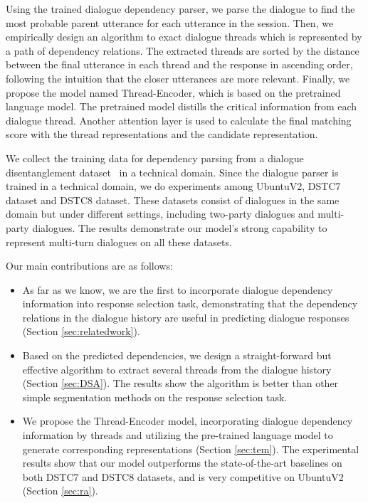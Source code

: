 Using the trained dialogue dependency parser, we parse the dialogue 
to find the most probable parent utterance for each utterance in the session. 
Then, we empirically design an algorithm to exact dialogue threads which is represented by a path of dependency relations.
The extracted threads are sorted by the distance between the final utterance in each 
thread and the response in ascending order, following the intuition that the closer utterances are more relevant.
Finally, we propose the model named Thread-Encoder, which is based on the pretrained language 
model. 
The pretrained model 
distills the critical information from each dialogue thread. 
Another attention layer is used to calculate the final matching score 
with the thread representations and the candidate representation. 

We collect the training data for dependency parsing from a dialogue 
disentanglement dataset~\cite{KummerfeldGPAGG19} in a technical domain. 
Since the dialogue parser is trained in a technical domain,  
we do experiments among UbuntuV2, DSTC7 dataset and DSTC8 dataset. 
These datasets consist of dialogues in the same domain but under different settings, 
including two-party dialogues and multi-party dialogues. 
The results demonstrate our model's strong capability to represent multi-turn
dialogues on all these datasets.

 
Our main contributions are as follows:
\begin{itemize}
	\item As far as we know, we are the first to incorporate dialogue 
dependency information into response selection task, 
demonstrating that the dependency relations in the dialogue history 
are useful in predicting dialogue responses (Section \ref{sec:relatedwork}). 
	\item Based on the predicted dependencies, we design a straight-forward but effective algorithm to extract several threads from the dialogue history  (Section \ref{sec:DSA}). 
The results show the algorithm is better than other simple segmentation 
methods on the response selection task.
	\item We propose the Thread-Encoder model, incorporating dialogue 
dependency information by threads and utilizing the pre-trained language 
model to generate corresponding representations (Section \ref{sec:tem}). The experimental results 
show that our model outperforms the state-of-the-art baselines on 
both DSTC7 and DSTC8 datasets, and is very competitive on UbuntuV2 (Section \ref{sec:ra}).
\end{itemize}






